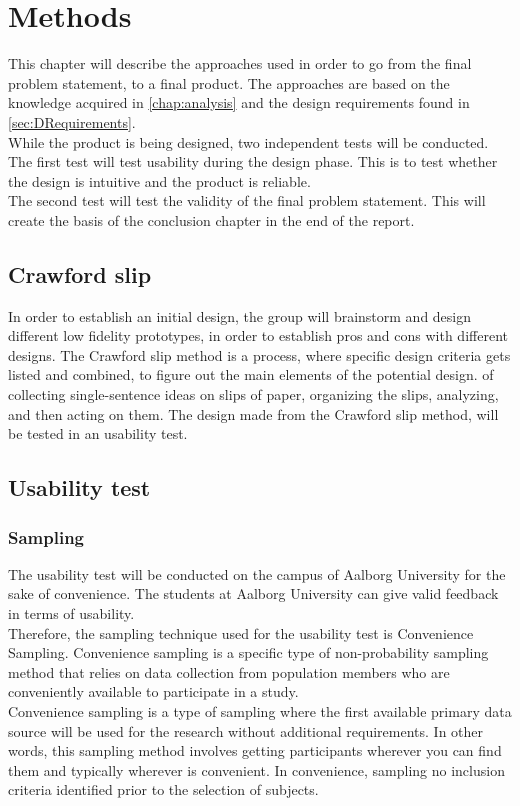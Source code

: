 \chapter{Methods}\label{chap:methods}
This chapter will describe the approaches used in order to go from the final problem statement, to a final product. The approaches are based on the knowledge acquired in \autoref{chap:analysis} and the design requirements found in \autoref{sec:DRequirements}.\\

While the product is being designed, two independent tests will be conducted. The first test will test usability during the design phase. This is to test whether the design is intuitive and the product is reliable.\\

The second test will test the validity of the final problem statement. This will create the basis of the conclusion chapter in the end of the report.\\

\section{Crawford slip}\label{sec:crawfordSlip}
In order to establish an initial design, the group will brainstorm and design different low fidelity prototypes, in order to establish pros and cons with different designs. 
The Crawford slip method is a process, where specific design criteria gets listed and combined, to figure out the main elements of the potential design\cite{crawfordSlip}.
of collecting single-sentence ideas on slips of paper, organizing the slips, analyzing, and then acting on them\cite{crawfordSlip}. The design made from the Crawford slip method, will be tested in an usability test.

\section{Usability test}

\subsection{Sampling}
The usability test will be conducted on the campus of Aalborg University for the sake of convenience. The students at Aalborg University can give valid feedback in terms of usability.\\

Therefore, the sampling technique used for the usability test is Convenience Sampling. Convenience sampling is a specific type of non-probability sampling method that relies on data collection from population members who are conveniently available to participate in a study. \cite{convSamp}\\
Convenience sampling is a type of sampling where the first available primary data source will be used for the research without additional requirements. In other words, this sampling method involves getting participants wherever you can find them and typically wherever is convenient.\cite{convSamp} In convenience, sampling no inclusion criteria identified prior to the selection of subjects. \cite{convSamp}\\

